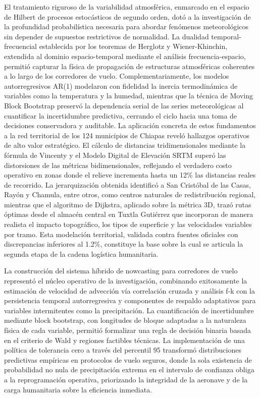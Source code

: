 \documentclass[
  spanish,
  us-letterpaper,
]{scrreprt}
\numberwithin{equation}{section}
\begin{document}
El tratamiento riguroso de la variabilidad atmosférica, enmarcado en el
espacio de Hilbert de procesos estocásticos de segundo orden, dotó a la
investigación de la profundidad probabilística necesaria para abordar
fenómenos meteorológicos sin depender de supuestos restrictivos de
normalidad. La dualidad temporal-frecuencial establecida por los
teoremas de Herglotz y Wiener-Khinchin, extendida al dominio
espacio-temporal mediante el análisis frecuencia-espacio, permitió
capturar la física de propagación de estructuras atmosféricas coherentes
a lo largo de los corredores de vuelo. Complementariamente, los modelos
autorregresivos AR(1) modelaron con fidelidad la inercia termodinámica
de variables como la temperatura y la humedad, mientras que la técnica
de Moving Block Bootstrap preservó la dependencia serial de las series
meteorológicas al cuantificar la incertidumbre predictiva, cerrando el
ciclo hacia una toma de decisiones conservadora y auditable. La
aplicación concreta de estos fundamentos a la red territorial de los 124
municipios de Chiapas reveló hallazgos operativos de alto valor
estratégico. El cálculo de distancias tridimensionales mediante la
fórmula de Vincenty y el Modelo Digital de Elevación SRTM superó las
distorsiones de las métricas bidimensionales, reflejando el verdadero
costo operativo en zonas donde el relieve incrementa hasta un 12\% las
distancias reales de recorrido. La jerarquización obtenida identificó a
San Cristóbal de las Casas, Rayón y Chamula, entre otros, como centros
naturales de redistribución regional, mientras que el algoritmo de
Dijkstra, aplicado sobre la métrica 3D, trazó rutas óptimas desde el
almacén central en Tuxtla Gutiérrez que incorporan de manera realista el
impacto topográfico, los tipos de superficie y las velocidades variables
por tramo. Esta modelación territorial, validada contra fuentes
oficiales con discrepancias inferiores al 1.2\%, constituye la base
sobre la cual se articula la segunda etapa de la cadena logística
humanitaria.

La construcción del sistema híbrido de nowcasting para corredores de
vuelo representó el núcleo operativo de la investigación, combinando
exitosamente la estimación de velocidad de advección vía correlación
cruzada y análisis f-k con la persistencia temporal autorregresiva y
componentes de respaldo adaptativos para variables intermitentes como la
precipitación. La cuantificación de incertidumbre mediante block
bootstrap, con longitudes de bloque adaptadas a la naturaleza física de
cada variable, permitió formalizar una regla de decisión binaria basada
en el criterio de Wald y regiones factibles técnicas. La implementación
de una política de tolerancia cero a través del percentil 95 transformó
distribuciones predictivas empíricas en protocolos de vuelo seguros,
donde la sola existencia de probabilidad no nula de precipitación
extrema en el intervalo de confianza obliga a la reprogramación
operativa, priorizando la integridad de la aeronave y de la carga
humanitaria sobre la eficiencia inmediata.
\end{document}
